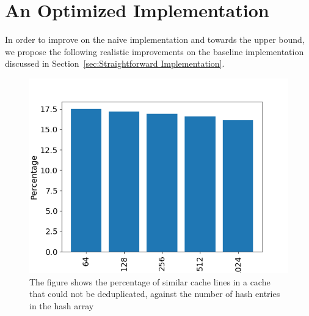 \section{An Optimized Implementation}
\label{sec:Final Implementation}
In order to improve on the naive implementation and towards the upper bound, we propose the following realistic improvements on the baseline implementation discussed in Section~\ref{sec:Straightforward Implementation}.
\begin{figure}
    \includegraphics[width=\textwidth]{NumHashes.png}
    \caption[Missed Dedup Opportunity vs Hashes]{The figure shows the percentage of similar cache lines in a cache that could not be deduplicated, against the number of hash entries in the hash array}
    \label{fig:numhashes}
\end{figure}
